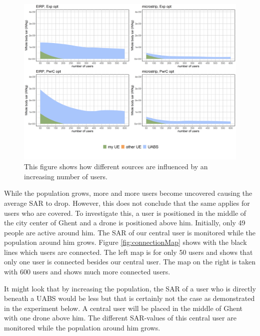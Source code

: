 \begin{figure}[h!]
\centering
  \includegraphics[width=\textwidth/6*5]{../results/s2/uFourSources.png}
  \caption{This figure shows how different sources are influenced by an increasing number of users. }
  \label{fig:s2fourSourcesMatrix}
\end{figure}

While the population grows, more and more users become uncovered causing the average SAR to drop. However, this does not conclude that the same applies for 
users who are covered. To investigate this, a user is positioned in the middle of the city center of Ghent and a drone is positioned above him. Initially, only 
49 people are active around him. The \gls{SAR} of our central user is monitored while the population around him grows.
Figure \ref{fig:connectionMap} shows with the black lines which users are connected. The left map is for only 50 users and 
shows that only one user is connected besides our central user. The map on the right is taken with 600 users and shows much more connected users.



It might look that by increasing the population, the SAR of a user who is directly beneath a \gls{UABS} would be less but that is 
certainly not the case as demonstrated in the experiment below. A central user will be placed in the middle of Ghent with one drone above him.
The different \gls{SAR}-values of this central user are monitored while the population around him grows.

